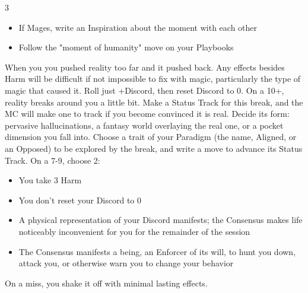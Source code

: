 \begin{multicols}{3}
\begin{move}
    \begin{itemize}
      \setlength\itemsep{0em}
    \item If Mages, write an Inspiration about the moment with each other
    \item Follow the "moment of humanity" move on your Playbooks
    \end{itemize}
  \end{move}

  \SEPARATOR

  \begin{move}
    When you  you pushed reality too far and it pushed back. Any effects besides Harm will be difficult if not impossible to fix with magic, particularly the type of magic that caused it. Roll just +Discord, then reset Discord to 0. On a 10+, reality breaks around you a little bit. Make a Status Track for this break, and the MC will make one to track if you become convinced it is real. Decide its form: pervasive hallucinations, a fantasy world overlaying the real one, or a pocket dimension you fall into. Choose a trait of your Paradigm (the name, Aligned, or an Opposed) to be explored by the break, and write a move to advance its Status Track. 
On a 7-9, choose 2:

    \begin{itemize}
      \setlength\itemsep{0em}
    \item You take 3 Harm
    \item You don’t reset your Discord to 0
    \item A physical representation of your Discord manifests; the Consensus makes life noticeably inconvenient for you for the remainder of the session
    \item The Consensus manifests a being, an Enforcer of its will, to hunt you down, attack you, or otherwise warn you to change your behavior 
    \end{itemize}
On a miss, you shake it off with minimal lasting effects.

  \end{move}

\end{multicols}
